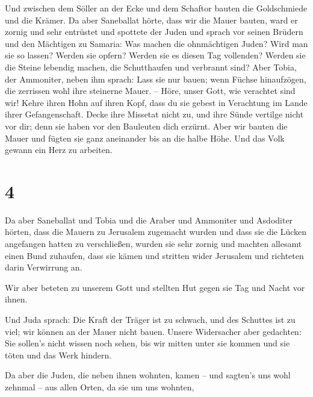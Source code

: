  Und zwischen dem Söller an der Ecke und dem Schaftor
bauten die Goldschmiede und die Krämer.  Da aber
Saneballat hörte, dass wir die Mauer bauten, ward er zornig und sehr
entrüstet und spottete der Juden  und sprach vor seinen
Brüdern und den Mächtigen zu Samaria: Was machen die ohnmächtigen Juden?
Wird man sie so lassen? Werden sie opfern? Werden sie es diesen Tag
vollenden? Werden sie die Steine lebendig machen, die Schutthaufen und
verbrannt sind?  Aber Tobia, der Ammoniter, neben ihm
sprach: Lass sie nur bauen; wenn Füchse hinaufzögen, die zerrissen wohl
ihre steinerne Mauer. --  Höre, unser Gott, wie verachtet
sind wir! Kehre ihren Hohn auf ihren Kopf, dass du sie gebest in
Verachtung im Lande ihrer Gefangenschaft.  Decke ihre
Missetat nicht zu, und ihre Sünde vertilge nicht vor dir; denn sie haben
vor den Bauleuten dich erzürnt.  Aber wir bauten die
Mauer und fügten sie ganz aneinander bis an die halbe Höhe. Und das Volk
gewann ein Herz zu arbeiten.

\hypertarget{section-3}{%
\section{4}\label{section-3}}

 Da aber Saneballat und Tobia und die Araber und Ammoniter
und Asdoditer hörten, dass die Mauern zu Jerusalem zugemacht wurden und
dass sie die Lücken angefangen hatten zu verschließen, wurden sie sehr
zornig  und machten allesamt einen Bund zuhaufen, dass sie
kämen und stritten wider Jerusalem und richteten darin Verwirrung an.

 Wir aber beteten zu unserem Gott und stellten Hut gegen
sie Tag und Nacht vor ihnen.

 Und Juda sprach: Die Kraft der Träger ist zu schwach, und
des Schuttes ist zu viel; wir können an der Mauer nicht bauen.
 Unsere Widersacher aber gedachten: Sie sollen's nicht
wissen noch sehen, bis wir mitten unter sie kommen und sie töten und das
Werk hindern.

 Da aber die Juden, die neben ihnen wohnten, kamen -- und
sagten's uns wohl zehnmal -- aus allen Orten, da sie um uns wohnten,

